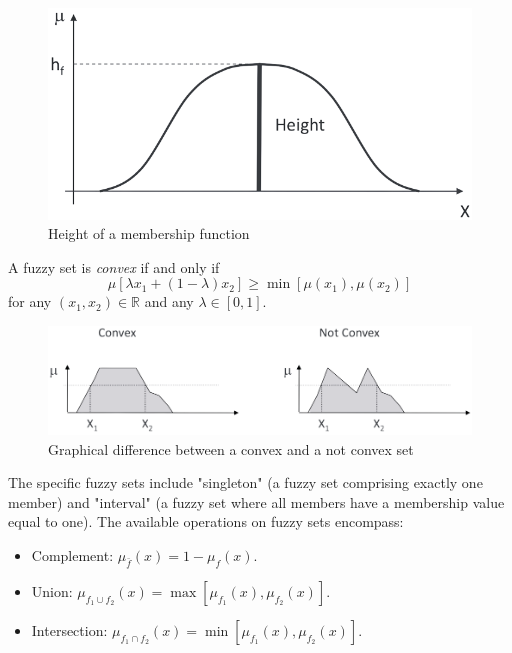 \begin{figure}[H]
    \centering
    \includegraphics[width=0.4\linewidth]{images/height.png}
    \caption{Height of a membership function}
\end{figure}
\begin{definition}
    A fuzzy set is \emph{convex} if and only if 
    \[\mu[\lambda x_1+(1-\lambda)x_2] \geq \min [\mu(x_1),\mu(x_2)]\]
    for any $(x_1,x_2) \in \mathbb{R}$ and any $\lambda \in [0,1]$.
\end{definition}
\begin{figure}[H]
    \centering
    \includegraphics[width=0.75\linewidth]{images/convex.png}
    \caption{Graphical difference between a convex and a not convex set}
\end{figure}
The specific fuzzy sets include "singleton" (a fuzzy set comprising exactly one member) and "interval" (a fuzzy set where all members have a membership value equal to one). 
The available operations on fuzzy sets encompass:
\begin{itemize}
    \item Complement: $\mu_{\bar{f}}(x)=1-\mu_f(x)$.
    \item Union: $\mu_{f_1 \cup f_2}(x)=\max [\mu_{f_1}(x),\mu_{f_2}(x)]$.
    \item Intersection: $\mu_{f_1 \cap f_2}(x)=\min [\mu_{f_1}(x),\mu_{f_2}(x)]$.
\end{itemize}